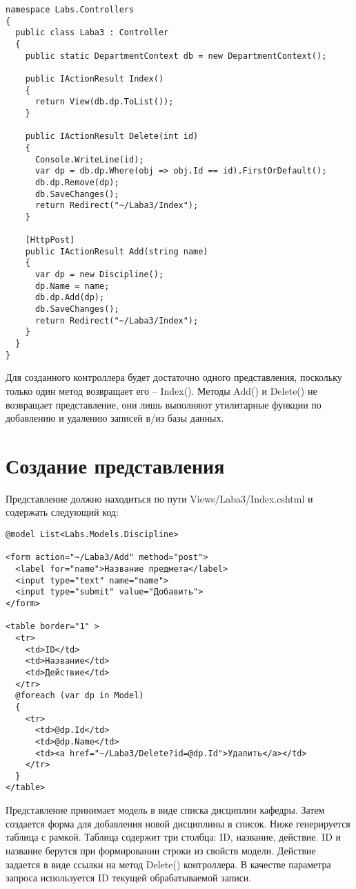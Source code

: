\begin{verbatim}
namespace Labs.Controllers
{
  public class Laba3 : Controller
  {
    public static DepartmentContext db = new DepartmentContext();
		
    public IActionResult Index()
    {
      return View(db.dp.ToList());
    }
		
    public IActionResult Delete(int id)
    {
      Console.WriteLine(id);
      var dp = db.dp.Where(obj => obj.Id == id).FirstOrDefault();
      db.dp.Remove(dp);
      db.SaveChanges();
      return Redirect("~/Laba3/Index");
    }
		
    [HttpPost]
    public IActionResult Add(string name)
    {
      var dp = new Discipline();
      dp.Name = name;
      db.dp.Add(dp);
      db.SaveChanges();
      return Redirect("~/Laba3/Index");
    }
  }
}
\end{verbatim}

Для созданного контроллера будет достаточно одного представления, поскольку только один метод возвращает его -- Index(). Методы Add() и Delete() не возвращает представление, они лишь выполняют утилитарные функции по добавлению и удалению записей в/из базы данных.

\section{Создание представления}
Представление должно находиться по пути Views/Laba3/Index.cshtml и содержать следующий код:

\begin{verbatim}
@model List<Labs.Models.Discipline>

<form action="~/Laba3/Add" method="post">
  <label for="name">Название предмета</label>
  <input type="text" name="name">
  <input type="submit" value="Добавить">
</form>

<table border="1" >
  <tr>
    <td>ID</td>
    <td>Название</td>
    <td>Действие</td>
  </tr>
  @foreach (var dp in Model)
  {
    <tr>
      <td>@dp.Id</td>
      <td>@dp.Name</td>
      <td><a href="~/Laba3/Delete?id=@dp.Id">Удалить</a></td>
    </tr>
  }
</table>
\end{verbatim}

Представление принимает модель в виде списка дисциплин кафедры. Затем создается форма для добавления новой дисциплины в список. Ниже генерируется таблица с рамкой. Таблица содержит три столбца: ID, название, действие. ID и название берутся при формировании строки из свойств модели. Действие задается в виде ссылки на метод Delete() контроллера. В качестве параметра запроса используется ID текущей обрабатываемой записи.